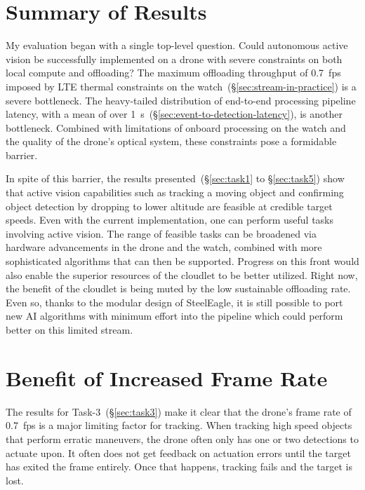 \section{Summary of Results}
\label{sec:take-away}

My evaluation began with a single top-level question.  Could
autonomous active vision be successfully implemented on a drone with
severe constraints on both local compute and offloading?  The maximum
offloading throughput of 0.7~fps imposed by LTE thermal constraints on
the watch~(\S\ref{sec:stream-in-practice}) is a severe bottleneck.  The
heavy-tailed distribution of end-to-end processing pipeline latency,
with a mean of over 1~s~(\S\ref{sec:event-to-detection-latency}), is another
bottleneck.  Combined with limitations of onboard processing on the
watch and the quality of the drone's optical system, these constraints
pose a formidable barrier.

In spite of this barrier, the results presented~(\S\ref{sec:task1} to
\S\ref{sec:task5}) show that active vision capabilities such as
tracking a moving object and confirming object detection by dropping
to lower altitude are feasible at credible target speeds.  Even with
the current implementation, one can perform useful tasks involving
active vision.  The range of feasible tasks can be broadened via
hardware advancements in the drone and the watch, combined with more
sophisticated algorithms that can then be supported.  Progress on this
front would also enable the superior resources of the cloudlet to be better
utilized.  Right now, the benefit of the cloudlet is being muted by the low
sustainable offloading rate. Even so, thanks to the modular design of SteelEagle, it is still possible to port new AI algorithms with minimum effort into the pipeline which could perform better on this limited stream.

\section{Benefit of Increased Frame Rate}
\label{sec:discussion-results}

The results for Task-3~(\S\ref{sec:task3}) make it clear that the
drone's frame rate of 0.7~fps is a major limiting factor for tracking.
When tracking high speed objects that perform erratic maneuvers, the
drone often only has one or two detections to actuate upon. It often
does not get feedback on actuation errors until the target has exited
the frame entirely. Once that happens, tracking fails and the target
is lost.

